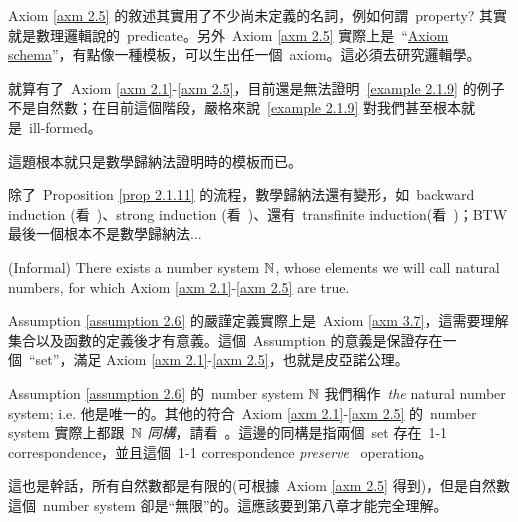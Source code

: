 \begin{remark}\label{rmk 2.1.10} Axiom \ref{axm 2.5} 的敘述其實用了不少尚未定義的名詞，例如何謂\ property? 其實就是數理邏輯說的\ predicate。另外\ Axiom \ref{axm 2.5} 實際上是\ ``\href{https://www.wikiwand.com/en/Axiom_schema}{Axiom schema}''，有點像一種模板，可以生出任一個\  axiom。這必須去研究邏輯學。
\end{remark}

\begin{note}
就算有了\ Axiom \ref{axm 2.1}-\ref{axm 2.5}，目前還是無法證明\  \ref{example 2.1.9} 的例子不是自然數；在目前這個階段，嚴格來說\ \ref{example 2.1.9} 對我們甚至根本就是\ ill-formed。
\end{note}

\begin{proposition}\label{prop 2.1.11}
這題根本就只是數學歸納法證明時的模板而已。
\end{proposition}

\begin{note}
除了\ Proposition \ref{prop 2.1.11} 的流程，數學歸納法還有變形，如\ backward induction (看\  )、strong induction (看\ )、還有\ transfinite induction(看\  )；BTW 最後一個根本不是數學歸納法...
\end{note}

\begin{assumption}\label{assumption 2.6} (Informal)
There exists a number system \(\mathbb{N}\), whose elements we will call natural numbers, for which Axiom \ref{axm 2.1}-\ref{axm 2.5} are true.
\end{assumption}
\begin{note}
Assumption \ref{assumption 2.6} 的嚴謹定義實際上是\ Axiom \ref{axm 3.7}，這需要理解集合以及函數的定義後才有意義。這個\ Assumption 的意義是保證存在一個\ ``set''，滿足 Axiom \ref{axm 2.1}-\ref{axm 2.5}，也就是皮亞諾公理。
\end{note}

\begin{remark}\label{remark 2.1.12} Assumption \ref{assumption 2.6} 的\ number system \(\mathbb{N}\) 我們稱作\ \emph{the} natural number system; i.e. 他是唯一的。其他的符合\ Axiom \ref{axm 2.1}-\ref{axm 2.5} 的\ number system 實際上都跟\ \(\mathbb{N}\) \emph{同構}，請看\  。這邊的同構是指兩個\ set 存在\ 1-1 correspondence，並且這個\ 1-1 correspondence \emph{preserve} \INC\ operation。
\end{remark}

\begin{remark}\label{remark 2.1.13}
這也是幹話，所有自然數都是有限的(可根據\ Axiom \ref{axm 2.5} 得到)，但是自然數這個\ number system 卻是``無限''的。這應該要到第八章才能完全理解。
\end{remark}

